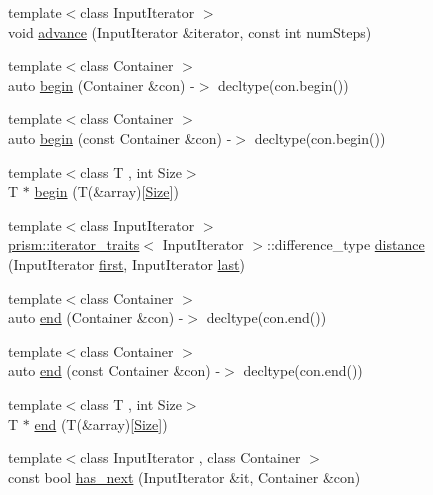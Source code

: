 \begin{DoxyCompactItemize}
\item 
{\footnotesize template$<$class Input\+Iterator $>$ }\\void \hyperlink{namespaceprism_a667eee76b54258f4f3530eaa7ef44d69}{advance} (Input\+Iterator \&iterator, const int num\+Steps)
\item 
{\footnotesize template$<$class Container $>$ }\\auto \hyperlink{namespaceprism_a6d7a987672303bcc2aad6eedfa3c97c5}{begin} (Container \&con) -\/$>$ decltype(con.\+begin())
\item 
{\footnotesize template$<$class Container $>$ }\\auto \hyperlink{namespaceprism_a1d797e0ebd535413f23ff6c378bce541}{begin} (const Container \&con) -\/$>$ decltype(con.\+begin())
\item 
{\footnotesize template$<$class T , int Size$>$ }\\T $\ast$ \hyperlink{namespaceprism_a1fa3ae5087a69ca4b87cd0142dd7f4f4}{begin} (T(\&array)\mbox{[}\hyperlink{classprism_1_1_size}{Size}\mbox{]})
\item 
{\footnotesize template$<$class Input\+Iterator $>$ }\\\hyperlink{structprism_1_1iterator__traits}{prism\+::iterator\+\_\+traits}$<$ Input\+Iterator $>$\+::difference\+\_\+type \hyperlink{namespaceprism_ad9a8b01383d77bc9bcd878901af6f8bb}{distance} (Input\+Iterator \hyperlink{namespaceprism_ae3fb7a1926a9e8e59300cd5e370470da}{first}, Input\+Iterator \hyperlink{namespaceprism_abe4956c4e865f55ca126b7fb973b5078}{last})
\item 
{\footnotesize template$<$class Container $>$ }\\auto \hyperlink{namespaceprism_acd1f6ce5ed6fe400694b77f49270ea36}{end} (Container \&con) -\/$>$ decltype(con.\+end())
\item 
{\footnotesize template$<$class Container $>$ }\\auto \hyperlink{namespaceprism_a81b99f9ade4f7bd30ab1c5a64a20d539}{end} (const Container \&con) -\/$>$ decltype(con.\+end())
\item 
{\footnotesize template$<$class T , int Size$>$ }\\T $\ast$ \hyperlink{namespaceprism_a9b7ee229aa856b527057b2abdf6cf144}{end} (T(\&array)\mbox{[}\hyperlink{classprism_1_1_size}{Size}\mbox{]})
\item 
{\footnotesize template$<$class Input\+Iterator , class Container $>$ }\\const bool \hyperlink{namespaceprism_ad56900cb33be6d15ac27a7c61bad2ce6}{has\+\_\+next} (Input\+Iterator \&it, Container \&con)

\end{DoxyCompactItemize}
